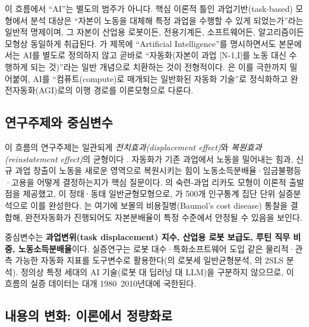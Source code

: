 \documentclass[11pt]{article}
\begin{document}
이 흐름에서 ``AI''는 별도의 범주가 아니다. 핵심 이론적 틀인 과업기반(task-based) 모형에서 분석 대상은 ``자본이 노동을 대체해 특정 과업을 수행할 수 있게 되었는가''라는 일반적 명제이며, 그 자본이 산업용 로봇이든, 전용기계든, 소프트웨어든, 알고리즘이든 모형상 동일하게 취급된다. \textcite{acemoglu-2018-artificial-intelligence-automation-and}가 제목에 ``Artificial Intelligence''를 명시하면서도 본문에서는 AI를 별도로 정의하지 않고 곧바로 ``자동화(자본이 과업 [N-1,I]를 노동 대신 수행하게 되는 것)''라는 일반 개념으로 치환하는 것이 전형적이다. \textcite{korinek-2024-scenarios-for-the-transition-to}은 이를 극한까지 밀어붙여, AI를 ``컴퓨트(compute)로 매개되는 일반화된 자동화 기술''로 정식화하고 완전자동화(AGI)로의 이행 경로를 이론모형으로 다룬다.

\subsection{연구주제와 중심변수}

이 흐름의 연구주제는 일관되게 \emph{전치효과(displacement effect)}와 \emph{복원효과(reinstatement effect)}의 균형이다 \parencite{acemoglu-2019-automation-and-new-tasks-how}. 자동화가 기존 과업에서 노동을 밀어내는 힘과, 신규 과업 창출이 노동을 새로운 영역으로 복원시키는 힘이 노동소득분배율·임금불평등·고용을 어떻게 결정하는지가 핵심 질문이다. \textcite{acemoglu-2011-skills-tasks-and-technologies-implications}의 숙련-과업 리카도 모형이 이론적 출발점을 제공했고, \textcite{acemoglu-2018-the-race-between-man-and}이 정태·동태 일반균형모형으로, \textcite{acemoglu-2022-tasks-automation-and-the-rise}가 500개 인구통계 집단 단위 실증분석으로 이를 완성한다. \textcite{aghion-2017-artificial-intelligence-and-economic-growth}는 여기에 보몰의 비용질병(Baumol's cost disease) 통찰을 결합해, 완전자동화가 진행되어도 자본분배율이 특정 수준에서 안정될 수 있음을 보인다.

중심변수는 \textbf{과업변위(task displacement) 지수, 산업용 로봇 보급도, 루틴 직무 비중, 노동소득분배율}이다. 실증연구는 로봇 대수·특화소프트웨어 도입 같은 물리적·관측 가능한 자동화 지표를 도구변수로 활용한다(\cite{humlum-2019-robot-adoption-and-labor-market}의 로봇세 일반균형분석, \cite{acemoglu-2022-tasks-automation-and-the-rise}의 2SLS 분석). 정의상 특정 세대의 AI 기술(로봇 대 딥러닝 대 LLM)을 구분하지 않으므로, 이 흐름의 실증 데이터는 대개 1980~2010년대에 국한된다.

\subsection{내용의 변화: 이론에서 정량화로}
\end{document}
